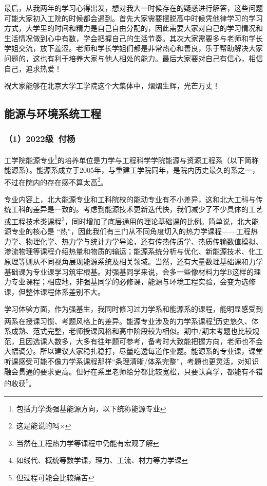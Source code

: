 \documentclass[11pt,oneside]{book}
\begin{document}
\vspace{10pt}

最后，从我两年的学习心得出发，想对我大一时候存在的疑惑进行解答，这些问题可能大家初入工院的时候都会遇到。首先大家需要摆脱高中时候凭他律学习的学习方式，大学里的时间和精力是自己自由分配的，因此需要大家对自己的学习情况和生活情况做到心中有数，学会把握自己的生活节奏。其次大家需要多与老师和学长学姐交流，放下羞涩。老师和学长学姐们都是非常热心和善良，乐于帮助解决大家问题的，这也有利于培养大家与他人相处的能力。最后大家要对自己有信心，相信自己，追求热爱！

\vspace{10pt}

祝大家能够在北京大学工学院这个大集体中，熠熠生辉，光芒万丈！

\subsection{能源与环境系统工程}
\subsubsection{（1）2022级\ 付杨}

工学院能源专业\footnote{包括力学类强基能源方向，以下统称能源专业}的培养单位是力学与工程科学学院能源与资源工程系（以下简称能源系）。能源系成立于2005年，与重建工学院同年，是院内历史最久的系之一，不过在院内的存在感不算太高\footnote{这是能说的吗×}。

专业内容上，北大能源专业和工科院校的能动专业有不小差异，这和北大工科与传统工科的差异是一致的。考虑到能源技术更新迭代快，我们减少了不少具体的工艺或工程技术类课程\footnote{当然在工程热力学等课程中仍能有宏观了解}，同时增加了底层通用的理论基础课的比例。简单说，北大能源专业的核心是 “热”，因此我们有三门从不同角度切入的热力学课程——工程热力学、物理化学、热力学与统计力学导论，还有传热传质学、热质传输数值模拟、渗流物理等课程介绍热量和物质的输运；能源系统分析与优化、新能源技术、化工原理等则从不同视角展现能源系统及相关领域。当然，还有大量数理基础课和力学基础课为专业课学习筑牢根基。对强基同学来说，会多一些像材料力学B这样的理力专业课程；相应地，非强基同学的必修课，能源与环境工程实验，会变为选修课，但整体课程体系差别不大。

\vspace{10pt}

学习体验方面，作为强基生，我同时修习过力学系和能源系的课程，能明显感受到两系在授课习惯、考题风格上的差异。能源专业涉及的力学系课程\footnote{如线代、概统等数学课，理力、工流、材力等力学课}历史悠久、体系成熟、范式完整，老师授课风格和高中阶段较为相似。期中/期末考题也比较规范，且因选课人数多，大多有往年题可参考，备考时大致能把握方向，老师也不会大幅调分。所以建议大家稳扎稳打，尽量吃透每道作业题。能源系的专业课，课堂听课感受可能不像力学系课程那样“条理清晰/体系完整”，考题也更灵活，对知识融会贯通的要求更高。但好在系里老师给分都比较宽松，只要认真学，都能有不错的收获\footnote{但过程可能会比较痛苦}。
\end{document}
